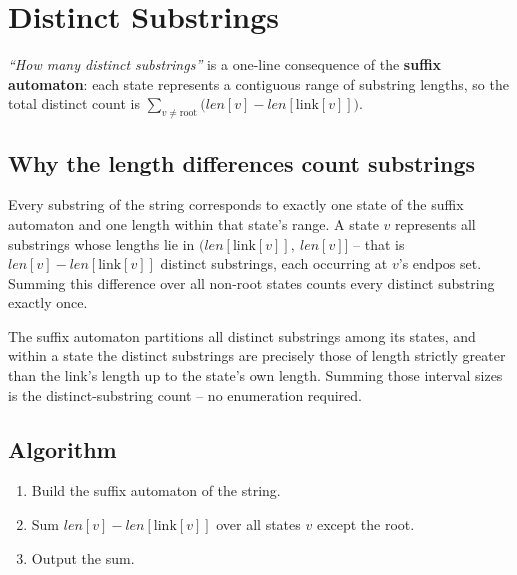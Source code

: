 \section{Distinct Substrings}
\label{sec:cses-distinct-substrings}


\begin{patternbox}
\emph{``How many distinct substrings''} is a one-line consequence of the
\textbf{suffix automaton}: each state represents a contiguous range of
substring lengths, so the total distinct count is
$\sum_{v\ne\text{root}}\big(\textit{len}[v]-\textit{len}[\text{link}[v]]\big)$.
\end{patternbox}

\subsection*{Why the length differences count substrings}

Every substring of the string corresponds to exactly one state of the
suffix automaton and one length within that state's range. A state $v$
represents all substrings whose lengths lie in
$(\textit{len}[\text{link}[v]],\ \textit{len}[v]]$ -- that is
$\textit{len}[v]-\textit{len}[\text{link}[v]]$ distinct substrings, each
occurring at $v$'s endpos set. Summing this difference over all non-root
states counts every distinct substring exactly once.

\begin{ideabox}
The suffix automaton partitions all distinct substrings among its states,
and within a state the distinct substrings are precisely those of length
strictly greater than the link's length up to the state's own length.
Summing those interval sizes is the distinct-substring count -- no
enumeration required.
\end{ideabox}

\subsection*{Algorithm}

\begin{enumerate}
  \item Build the suffix automaton of the string.
  \item Sum $\textit{len}[v]-\textit{len}[\text{link}[v]]$ over all states
        $v$ except the root.
  \item Output the sum.
\end{enumerate}

